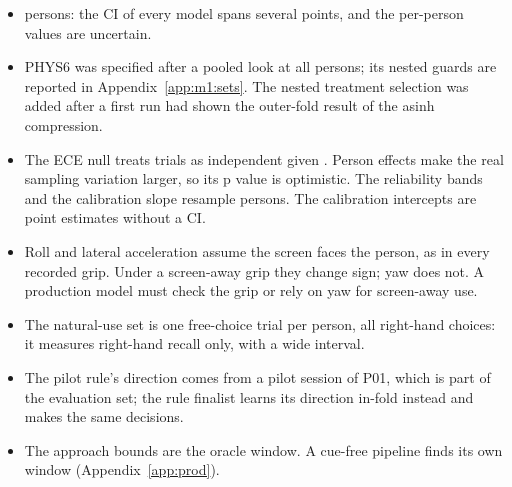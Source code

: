\begin{itemize}[leftmargin=1.2em,itemsep=1pt]
  \item {} persons: the CI of every model spans several points, and the per-person
    values are uncertain.
  \item PHYS6 was specified after a pooled look at all persons; its nested guards are reported in
    Appendix~\ref{app:m1:sets}. The nested treatment selection was added after a first run had shown
    the outer-fold result of the asinh compression.
  \item The ECE null treats trials as independent given \pright{}. Person effects make the real
    sampling variation larger, so its p value is optimistic. The reliability bands and the
    calibration slope resample persons. The calibration intercepts are point estimates without a CI.
  \item Roll and lateral acceleration assume the screen faces the person, as in every recorded grip.
    Under a screen-away grip they change sign; yaw does not. A production model must check the grip
    or rely on yaw for screen-away use.
  \item The natural-use set is one free-choice trial per person, all right-hand choices: it measures
    right-hand recall only, with a wide interval.
  \item The pilot rule's direction comes from a pilot session of P01, which is part of the evaluation
    set; the rule finalist learns its direction in-fold instead and makes the same decisions.
  \item The approach bounds are the oracle window. A cue-free pipeline finds its own window
    (Appendix~\ref{app:prod}).
\end{itemize}
